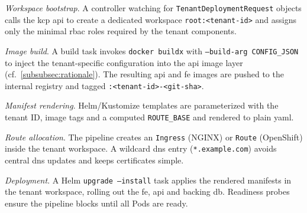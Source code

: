 \documentclass[11pt, a4paper, oneside, listof=totoc]{scrartcl}
\begin{document}
                \begin{enumerate}[label={[\arabic*]:},
                    ref=Challenge~\arabic*,
                    leftmargin=*,
                    itemsep=0.6\baselineskip]

                    \item\label{chal:bootstrap}
                        \textit{Workspace bootstrap}.  
                        A controller watching for \texttt{TenantDeploymentRequest} objects
                        calls the \gls{kcp} \gls{api} to create a dedicated workspace
                        \texttt{root:\textless{}tenant-id\textgreater{}} and assigns only the
                        minimal \gls{rbac} roles required by the tenant components.


                    \item\label{chal:imageBuild}
                        \textit{Image build}.
                        A build task invokes \texttt{docker buildx} with
                        \texttt{--build-arg CONFIG\_JSON} to inject the tenant-specific
                        configuration into the \gls{api} image layer
                        (cf.~\autoref{subsubsec:rationale}).  
                        The resulting \gls{api} and \gls{fe} images are pushed to the internal
                        registry and tagged
                        \texttt{:\textless{}tenant-id\textgreater{}-\textless{}git-sha\textgreater{}}.

                    \item\label{chal:manifestRendering}
                        \textit{Manifest rendering}.
                        Helm/Kustomize templates are parameterized with the tenant ID, image
                        tags and a computed \texttt{ROUTE\_BASE} and rendered to plain \gls{yaml}.

                    \item\label{chal:routeAllocation}
                        \textit{Route allocation}.
                        The pipeline creates an \texttt{Ingress} (NGINX) or \texttt{Route}
                        (OpenShift) inside the tenant workspace.
                        A wildcard \gls{dns} entry (\texttt{*.example.com}) avoids central \gls{dns}
                        updates and keeps certificates simple.

                    \item\label{chal:applyManifests}
                        \textit{Deployment}.  
                        A Helm \texttt{upgrade --install} task applies the rendered manifests
                        in the tenant workspace, rolling out the \gls{fe}, \gls{api} and
                        backing \gls{db}.  
                        Readiness probes ensure the pipeline blocks until all Pods are ready.


\end{enumerate}
\end{document}
